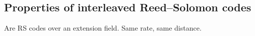 







\subsection{Properties of interleaved Reed--Solomon codes}

Are RS codes over an extension field. 
Same rate, same distance.  

